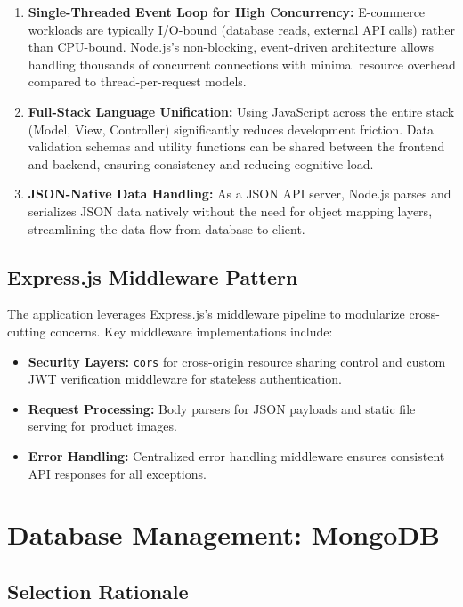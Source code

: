 \documentclass[12pt, a4paper]{report}
\begin{document}
\begin{enumerate}
    \item \textbf{Single-Threaded Event Loop for High Concurrency:} 
    E-commerce workloads are typically I/O-bound (database reads, external API calls) rather than CPU-bound. Node.js's non-blocking, event-driven architecture allows handling thousands of concurrent connections with minimal resource overhead compared to thread-per-request models.
    
    \item \textbf{Full-Stack Language Unification:} 
    Using JavaScript across the entire stack (Model, View, Controller) significantly reduces development friction. Data validation schemas and utility functions can be shared between the frontend and backend, ensuring consistency and reducing cognitive load.
    
    \item \textbf{JSON-Native Data Handling:} 
    As a JSON API server, Node.js parses and serializes JSON data natively without the need for object mapping layers, streamlining the data flow from database to client.
\end{enumerate}

\subsection{Express.js Middleware Pattern}

The application leverages Express.js's middleware pipeline to modularize cross-cutting concerns. Key middleware implementations include:

\begin{itemize}
    \item \textbf{Security Layers:} \texttt{cors} for cross-origin resource sharing control and custom JWT verification middleware for stateless authentication.
    \item \textbf{Request Processing:} Body parsers for JSON payloads and static file serving for product images.
    \item \textbf{Error Handling:} Centralized error handling middleware ensures consistent API responses for all exceptions.
\end{itemize}

\section{Database Management: MongoDB}

\subsection{Selection Rationale}
\end{document}
